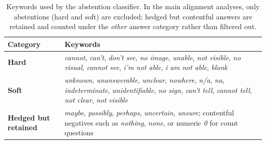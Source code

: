 \begin{table}[ht]
\centering
\small
\setlength{\tabcolsep}{4pt}

\caption{Keywords used by the abstention classifier. In the main alignment analyses, only abstentions (hard and soft) are excluded; hedged but contentful answers are retained and counted under the \textit{other} answer category rather than filtered out.}
\label{tab:abstention_keywords}
\begin{tabular}{@{}p{}p{}@{}}
\toprule
\textbf{Category} & \textbf{Keywords} \\
\midrule
\textbf{Hard} &
\textit{cannot}, \textit{can't}, \textit{don't see}, \textit{no image},
\textit{unable}, \textit{not visible}, \textit{no visual},
\textit{cannot see}, \textit{i'm not able}, \textit{i am not able},
\textit{blank} \\
\midrule
\textbf{Soft} &
\textit{unknown}, \textit{unanswerable}, \textit{unclear},
\textit{nowhere}, \textit{n/a}, \textit{na}, \textit{indeterminate},
\textit{unidentifiable}, \textit{no sign}, \textit{can't tell},
\textit{cannot tell}, \textit{not clear}, \textit{not visible} \\
\midrule
\textbf{Hedged but retained} &
\textit{maybe}, \textit{possibly}, \textit{perhaps}, \textit{uncertain},
\textit{unsure}; contentful negatives such as \textit{nothing}, \textit{none},
or numeric \textit{0} for count questions \\
\bottomrule
\end{tabular}
\end{table}
